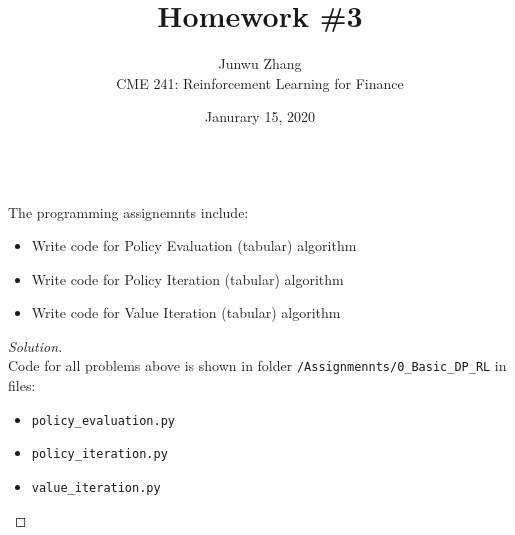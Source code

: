 \documentclass[12pt]{article}
\date{Janurary 15, 2020}
\newenvironment{problem}[2][Problem]{\begin{trivlist}
\item[\hskip \labelsep {\bfseries #1}\hskip \labelsep {\bfseries #2.}]}{\end{trivlist}}
\newenvironment{solution}
  {\renewcommand\qedsymbol{$\blacksquare$}\begin{proof}[Solution]}
  {\end{proof}}
\begin{document}
 
\title{Homework \#3}
\author{Junwu Zhang\\ 
CME 241: Reinforcement Learning for Finance}
 
\maketitle

\begin{problem}{1}
	\text{ }\\
	The programming assignemnts include:
	\begin{itemize}[noitemsep]
		\item Write code for Policy Evaluation (tabular) algorithm
		\item Write code for Policy Iteration (tabular) algorithm
		\item Write code for Value Iteration (tabular) algorithm
	\end{itemize}
\end{problem}
\begin{solution}
	\text{ }\\
	Code for all problems above is shown in folder \verb|/Assignmennts/0_Basic_DP_RL| in files:
	\begin{itemize}[noitemsep]
		\item \verb|policy_evaluation.py|
		\item \verb|policy_iteration.py|
		\item  \verb|value_iteration.py|
	\end{itemize}
\end{solution}
\end{document}
